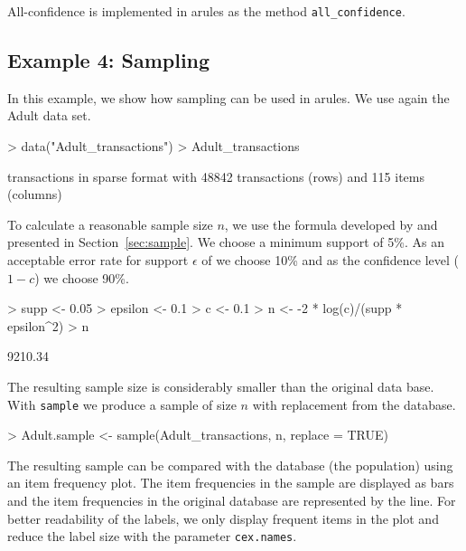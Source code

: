 \documentclass[10pt,a4paper]{article}
\newcommand{\strong}[1]{{\normalfont\fontseries{b}\selectfont #1}}
\newcommand{\code}[1]{\texttt{#1}}
\newcommand{\pkg}[1]{\strong{#1}}
\begin{document}
All-confidence is implemented in \pkg{arules} as the method 
\code{all\_confidence}.

\subsection{Example 4: Sampling}
In this example, we show how sampling
can be used in \pkg{arules}. We use again the Adult data set.

\begin{Schunk}
\begin{Sinput}
> data("Adult_transactions")
> Adult_transactions
\end{Sinput}
\begin{Soutput}
transactions in sparse format with
 48842 transactions (rows) and
 115 items (columns)

\end{Soutput}
\end{Schunk}

To calculate a reasonable sample size $n$, we use the formula developed
by \cite{arules:Zaki+Parthasarathy+Li+Ogihara:1997} and presented in 
Section~\ref{sec:sample}. We choose a minimum support of 5\%.
As an acceptable error rate for support $\epsilon$ of we choose 10\% and
as the confidence level ($1-c$) we choose 90\%. 

\begin{Schunk}
\begin{Sinput}
> supp <- 0.05
> epsilon <- 0.1
> c <- 0.1
> n <- -2 * log(c)/(supp * epsilon^2)
> n
\end{Sinput}
\begin{Soutput}
[1] 9210.34

\end{Soutput}
\end{Schunk}

The resulting sample size is considerably smaller than the original data base.
With \code{sample} we produce a sample of size $n$ with replacement from
the database.


\begin{Schunk}
\begin{Sinput}
> Adult.sample <- sample(Adult_transactions, n, replace = TRUE)
\end{Sinput}
\end{Schunk}

The resulting sample can be compared with the 
database (the population) using an item frequency plot.
The item frequencies in the sample are displayed as bars and the
item frequencies in the original database are represented by 
the line. For better readability of the labels, we
only display frequent items in the plot and reduce
the label size with the parameter \code{cex.names}.
\end{document}
